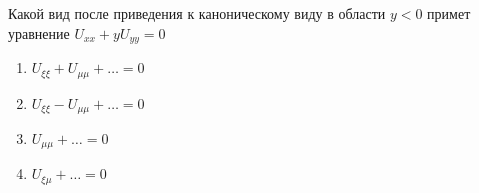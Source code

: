 Какой вид после приведения к каноническому виду в области \(y < 0\) примет уравнение \(U_{xx}+yU_{yy}=0\)

\begin{enumerate}[label=\arabic*)]
    \item \(U_{\xi \xi }+U_{\mu \mu }+\dots =0\)
    \item \(U_{\xi \xi }-U_{\mu \mu }+\dots =0\)
    \item \(U_{\mu \mu }+\dots =0\)
    \item \(U_{\xi \mu }+\dots =0\)
\end{enumerate}

